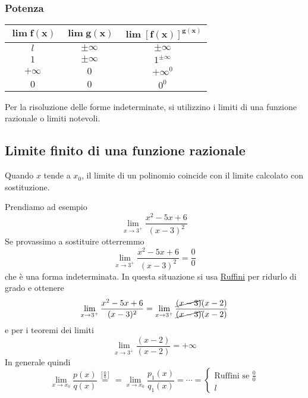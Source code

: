 \subsubsection{Potenza}
\begin{center}
  \begin{tabular}{ccc}
    $\boldsymbol{\lim f(x)}$ & $\boldsymbol{\lim g(x)}$ &
    $\boldsymbol{\lim[f(x)]^{g(x)}}$\\\hline
    $l$ & $\pm\infty$ & $\pm\infty$\\
    $1$ & $\pm\infty$ & $\boxed{1^{\pm\infty}}$\\
    $+\infty$ & $0$ & $\boxed{+\infty^0}$\\
    $0$ & $0$ & $\boxed{0^0}$
  \end{tabular}
\end{center}

Per la risoluzione delle forme indeterminate, si utilizzino i limiti di una funzione razionale o 
limiti notevoli.

\subsection{Limite finito di una funzione razionale}
\begin{limiteFinitoFunzRaz}
  Quando $x$ tende a $x_0$, il limite di un polinomio coincide con il limite calcolato con 
  sostituzione.
\end{limiteFinitoFunzRaz}

Prendiamo ad esempio
\begin{equation*}
  \lim\limits_{x\to3^+}\frac{x^2-5x+6}{(x-3)^2}
\end{equation*}
Se provassimo a sostituire otterremmo
\begin{equation*}
  \lim\limits_{x\to3^+}\frac{x^2-5x+6}{(x-3)^2} = \frac{0}{0}
\end{equation*}
che è una forma indeterminata. In questa situazione si usa \hyperref[ruffini]{Ruffini} per ridurlo di
grado e ottenere
\begin{equation*}
  \lim\limits_{x\to3^+}\frac{x^2-5x+6}{(x-3)^2} = 
  \lim\limits_{x\to3^+}\frac{\cancel{(x-3)}(x-2)}{\cancel{(x-3)}(x-2)}
\end{equation*}
e per i teoremi dei limiti
\begin{equation*}
  \lim\limits_{x\to3^+}\frac{(x-2)}{(x-2)} = +\infty
\end{equation*}
In generale quindi
\begin{equation*}
  \lim\limits_{x\to x_0}\frac{p(x)}{q(x)} \overset{\left[\frac{0}{0}\right]}{=} =
  \lim\limits_{x\to x_0}\frac{p_1(x)}{q_1(x)} = \dotsb = \begin{cases}
    \text{Ruffini se }\frac{0}{0}\\
    l
  \end{cases}
\end{equation*}


